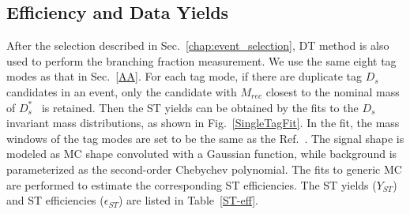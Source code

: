 \documentclass[aps,prd,twocolumn,showpacs,amsmath,amssymb]{revtex4-1}
\begin{document}
\subsection{Efficiency and Data Yields}
After the selection described in Sec.~\ref{chap:event_selection}, DT method is also used to perform the branching fraction measurement.
We use the same eight tag modes as that in Sec.~\ref{AA}.
For each tag mode, if there are duplicate tag $D_{s}$ candidates in an event, only the candidate with $M_{rec}$ closest to the nominal mass of $D_{s}^{*}$~\cite{PDG} is retained.
Then the ST yields can be obtained by the fits to the $D_{s}$ invariant mass distributions, as shown in Fig.~\ref{SingleTagFit}.
In the fit, the mass windows of the tag modes are set to be the same as the Ref.~\cite{Doc-DB-630-v35}.
The signal shape is modeled as MC shape convoluted with a Gaussian function, while background is parameterized as the second-order Chebychev polynomial.
The fits to generic MC are performed to estimate the corresponding ST efficiencies.  
The ST yields ($Y_{ST}$) and ST efficiencies ($\epsilon_{ST}$) are listed in Table~\ref{ST-eff}.
\end{document}
